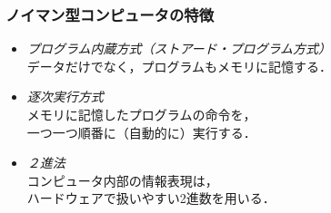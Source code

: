 \documentclass{beamer}                 %
\begin{document}
\begin{frame}
  \frametitle{ノイマン型コンピュータの特徴}
  \begin{itemize}
  \item \emph{プログラム内蔵方式（ストアード・プログラム方式）} \\
    データだけでなく，プログラムもメモリに記憶する．
    \vfill
  \item \emph{逐次実行方式} \\
    メモリに記憶したプログラムの命令を，\\
    一つ一つ順番に（自動的に）実行する．
    \vfill
  \item \emph{２進法} \\
    コンピュータ内部の情報表現は，\\
    ハードウェアで扱いやすい2進数を用いる．
    \vfill
  \end{itemize}
\end{frame}
\end{document}
